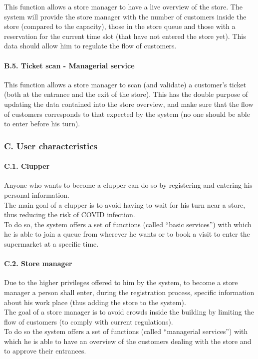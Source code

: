This function allows a store manager to have a live overview of the
store. The system will provide the store manager with the number of
customers inside the store (compared to the capacity), those in the
store queue and those with a reservation for the current time slot (that
have not entered the store yet). This data should allow him to regulate
the flow of customers.

\hypertarget{b.5.-ticket-scan---managerial-service}{%
\paragraph{B.5. Ticket scan - Managerial
service}\label{b.5.-ticket-scan---managerial-service}}

This function allows a store manager to scan (and validate) a customer's
ticket (both at the entrance and the exit of the store). This has the
double purpose of updating the data contained into the store overview,
and make sure that the flow of customers corresponds to that expected by
the system (no one should be able to enter before his turn).

\hypertarget{c.-user-characteristics}{%
\subsubsection{C. User characteristics}\label{c.-user-characteristics}}

\hypertarget{c.1.-clupper}{%
\paragraph{C.1. Clupper}\label{c.1.-clupper}}

Anyone who wants to become a clupper can do so by registering and
entering his personal information.\\
The main goal of a clupper is to avoid having to wait for his turn near
a store, thus reducing the risk of COVID infection.\\
To do so, the system offers a set of functions (called ``basic
services'') with which he is able to join a queue from wherever he wants
or to book a visit to enter the supermarket at a specific time.

\hypertarget{c.2.-store-manager}{%
\paragraph{C.2. Store manager}\label{c.2.-store-manager}}

Due to the higher privileges offered to him by the system, to become a
store manager a person shall enter, during the registration process,
specific information about his work place (thus adding the store to the
system).\\
The goal of a store manager is to avoid crowds inside the building by
limiting the flow of customers (to comply with current regulations).\\
To do so the system offers a set of functions (called ``managerial
services'') with which he is able to have an overview of the customers
dealing with the store and to approve their entrances.

